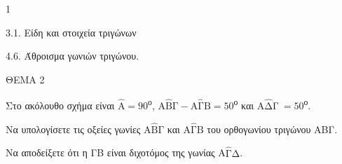 \begin{ylh}{1}
    \item 3.1. Είδη και στοιχεία τριγώνων
    \item 4.6. Άθροισμα γωνιών τριγώνου.
\end{ylh}

ΘΕΜΑ 2

Στο ακόλουθο σχήμα είναι $\widehat{\text{Α}} = \text{9}$0\textsuperscript{ο}, $\text{Α}\widehat{\text{Β}}\text{Γ} - \text{Α}\widehat{\text{Γ}}\text{Β} = 5$0\textsuperscript{ο} και $\text{Α}\widehat{\text{Δ}}$Γ$\  = 5$0\textsuperscript{ο}.

\begin{alist}
\item Να υπολογίσετε τις οξείες γωνίες $\text{Α}\widehat{\text{Β}}\text{Γ}$ και $\text{Α}\widehat{\text{Γ}}\text{Β}$ του ορθογωνίου τριγώνου ΑΒΓ.


\item Nα αποδείξετε ότι η ΓΒ είναι διχοτόμος της γωνίας Α$\widehat{\text{Γ}}\text{Δ}$.



\end{alist}
